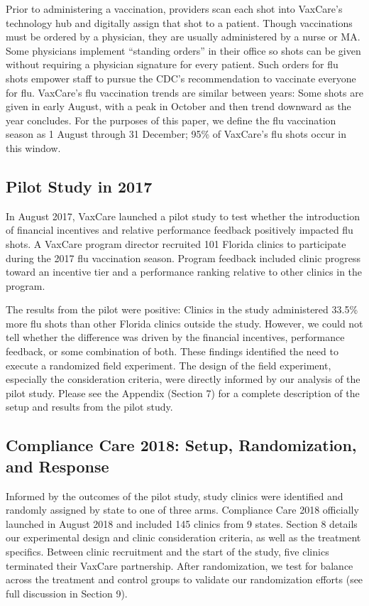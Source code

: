 \begin{onehalfspace}
 Prior to administering a vaccination, providers scan each shot into VaxCare’s technology hub and digitally assign that shot to a patient. Though vaccinations must be ordered by a physician, they are usually administered by a nurse or MA. Some physicians implement “standing orders” in their office so shots can be given without requiring a physician signature for every patient. Such orders for flu shots empower staff to pursue the CDC’s recommendation to vaccinate everyone for flu. VaxCare’s flu vaccination trends are similar between years: Some shots are given in early August, with a peak in October and then trend downward as the year concludes. For the purposes of this paper, we define the flu vaccination season as 1 August through 31 December; 95\% of VaxCare’s flu shots occur in this window. 

 \subsection{Pilot Study in 2017}
 In August 2017, VaxCare launched a pilot study to test whether the introduction of financial incentives and relative performance feedback positively impacted flu shots. A VaxCare program director recruited 101 Florida clinics to participate during the 2017 flu vaccination season. Program feedback included clinic progress toward an incentive tier and a performance ranking relative to other clinics in the program.
 
 The results from the pilot were positive: Clinics in the study administered 33.5\% more flu shots than other Florida clinics outside the study. However, we could not tell whether the difference was driven by the financial incentives, performance feedback, or some combination of both. These findings identified the need to execute a randomized field experiment. The design of the field experiment, especially the consideration criteria, were directly informed by our analysis of the pilot study. Please see the Appendix (Section 7) for a complete description of the setup and results from the pilot study.

 \subsection{Compliance Care 2018: Setup, Randomization, and Response}
 Informed by the outcomes of the pilot study, study clinics were identified and randomly assigned by state to one of three arms. Compliance Care 2018 officially launched in August 2018 and included 145 clinics from 9 states. Section 8 details our experimental design and clinic consideration criteria, as well as the treatment specifics. Between clinic recruitment and the start of the study, five clinics terminated their VaxCare partnership. After randomization, we test for balance across the treatment and control groups to validate our randomization efforts (see full discussion in Section 9).
 

\end{onehalfspace}
